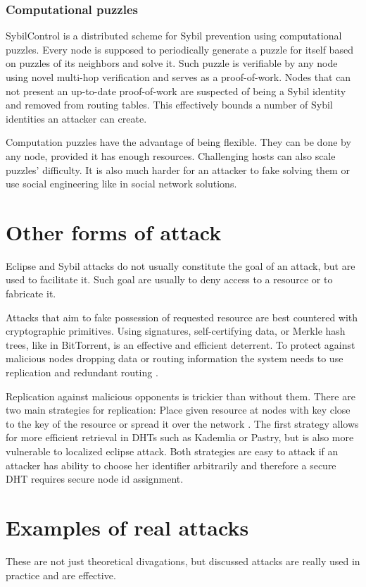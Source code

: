   \subsubsection{Computational puzzles}
  SybilControl\cite{li12} is a distributed scheme for Sybil prevention using
  computational puzzles. Every node is supposed to periodically generate a
  puzzle for itself based on puzzles of its neighbors and solve it. Such puzzle
  is verifiable by any node using novel multi-hop verification and serves as a
  proof-of-work. Nodes that can not present an up-to-date proof-of-work are
  suspected of being a Sybil identity and removed from routing tables. This
  effectively bounds a number of Sybil identities an attacker can create.

  Computation puzzles have the advantage of being flexible. They can be done by
  any node, provided it has enough resources. Challenging hosts can also scale
  puzzles' difficulty. It is also much harder for an attacker to fake
  solving them or use social engineering like in social network solutions.

\section{Other forms of attack}
  Eclipse and Sybil attacks do not usually constitute the goal of an attack, but
  are used to facilitate it. Such goal are usually to deny access to a resource
  or to fabricate it.

  Attacks that aim to fake possession of requested resource are best countered
  with cryptographic primitives. Using signatures, self-certifying data, or
  Merkle hash trees, like in BitTorrent, is an effective and efficient
  deterrent. To protect against malicious nodes dropping data or routing
  information the system needs to use replication and redundant routing
  \cite{dou02}. 

  Replication against malicious opponents is trickier than without them. There
  are two main strategies for replication: Place given resource at nodes with
  key close to the key of the resource or spread it over the network \cite[p.
  38]{urd11}. The first strategy allows for more efficient retrieval in DHTs
  such as Kademlia or Pastry, but is also more vulnerable to localized eclipse
  attack. Both strategies are easy to attack if an attacker has ability to
  choose her identifier arbitrarily and therefore a secure DHT requires secure
  node id assignment.

\section{Examples of real attacks}
These are not just theoretical divagations, but discussed attacks are really
used in practice and are effective.

